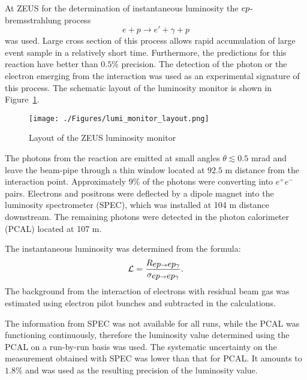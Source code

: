 At ZEUS for the determination of instantaneous luminosity the $\mbox{$e p$}$-bremsstrahlung process 
\begin{equation}
	e + p \rightarrow e' + \gamma + p
\end{equation}
was used. Large cross section of this process allows rapid accumulation of large event sample in a relatively short time. Furthermore, the predictions for this reaction have better than $0.5\%$ precision. The detection of the photon or the electron emerging from the interaction was used as an experimental signature of this process. The schematic layout of the luminosity monitor is shown in Figure~\ref{fig:lumi_monitor_layout}.
\begin{figure}
	\centering
		\texttt{[image: ./Figures/lumi\_monitor\_layout.png]}
	\caption{Layout of the ZEUS luminosity monitor}
	\label{fig:lumi_monitor_layout}
\end{figure}
The photons from the reaction are emitted at small angles $\theta \lesssim 0.5$ mrad and leave the beam-pipe through a thin window located at $92.5$ m distance from the interaction point. Approximately $9\%$ of the photons were converting into $e^+e^-$ pairs. Electrons and positrons were deflected by a dipole magnet into the luminosity spectrometer (SPEC), which was installed at 104 m distance downstream. The remaining photons were detected in the photon calorimeter (PCAL) located at 107 m.

The instantaneous luminosity was determined from the formula:
\begin{equation}
\mathcal{L} = \frac{R_{\mbox{$e p$}\rightarrow \mbox{$e p$}\gamma}}{ \sigma_{\mbox{$e p$}\rightarrow \mbox{$e p$}\gamma}}.
\end{equation}
The background from the interaction of electrons with residual beam gas was estimated using electron pilot bunches and subtracted in the calculations.

The information from SPEC was not available for all runs, while the PCAL was functioning continuously, therefore the luminosity value determined using the PCAL on a run-by-run basis was used. The systematic uncertainty on the measurement obtained with SPEC was lower than that for PCAL. It amounts to $1.8\%$ and was used as the resulting precision of the luminosity value.


